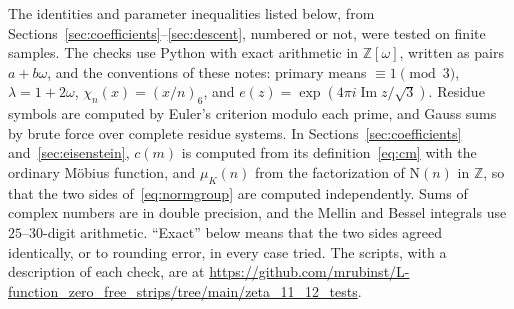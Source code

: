 \documentclass[11pt]{article}
\newcommand{\OO}{\mathbb Z[\omega]}
\newcommand{\N}{\mathrm N}
\newcommand{\muk}{\mu_K}
\numberwithin{equation}{section}
\begin{document}
The identities and parameter inequalities listed below, from Sections~\ref{sec:coefficients}--\ref{sec:descent},
numbered or not, were tested on finite samples. The checks use Python with exact arithmetic in $\OO$, written as pairs
$a+b\omega$, and the conventions of these notes: primary means $\equiv1\pmod3$,
$\lambda=1+2\omega$, $\chi_n(x)=(x/n)_6$, and $e(z)=\exp(4\pi i\operatorname{Im}z/\sqrt3)$. Residue
symbols are computed by Euler's criterion modulo each prime, and Gauss sums by brute force over
complete residue systems. In Sections~\ref{sec:coefficients} and~\ref{sec:eisenstein}, $c(m)$ is computed
from its definition~\eqref{eq:cm} with the ordinary M\"obius function, and $\muk(n)$ from the
factorization of $\N(n)$ in $\mathbb Z$, so that the two sides of~\eqref{eq:normgroup} are computed
independently. Sums of complex numbers are in double precision, and the Mellin and Bessel
integrals use $25$--$30$-digit arithmetic. ``Exact'' below means that the two sides agreed
identically, or to rounding error, in every case tried. The scripts, with a description of each check,
are at \url{https://github.com/mrubinst/L-function_zero_free_strips/tree/main/zeta_11_12_tests}.
\end{document}
